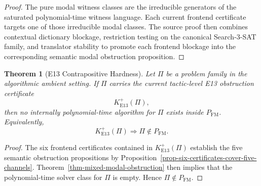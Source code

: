 \documentclass[11pt]{article}
\newtheorem{theorem}{Theorem}[section]
\theoremstyle{definition}
\theoremstyle{remark}
\newcommand{\FM}{\mathrm{FM}}
\begin{document}
\begin{proof}
The pure modal witness classes are the irreducible generators of the saturated polynomial-time witness language. Each current frontend certificate targets one of those irreducible modal classes. The source proof then combines contextual dictionary blockage, restriction testing on the canonical Search-3-SAT family, and translator stability to promote each frontend blockage into the corresponding semantic modal obstruction proposition.
\end{proof}

\begin{theorem}[E13 Contrapositive Hardness]\label{thm-e13-contrapositive-hardness}
Let $\Pi$ be a problem family in the algorithmic ambient setting. If $\Pi$ carries the current tactic-level E13 obstruction certificate
\[
K_{\mathrm{E13}}^+(\Pi),
\]
then no internally polynomial-time algorithm for $\Pi$ exists inside $P_{\FM}$. Equivalently,
\[
K_{\mathrm{E13}}^+(\Pi) \Rightarrow \Pi \notin P_{\FM}.
\]
\end{theorem}

\begin{proof}
The six frontend certificates contained in $K_{\mathrm{E13}}^+(\Pi)$ establish the five semantic obstruction propositions by Proposition~\ref{prop-six-certificates-cover-five-channels}. Theorem~\ref{thm-mixed-modal-obstruction} then implies that the polynomial-time solver class for $\Pi$ is empty. Hence $\Pi \notin P_{\FM}$.
\end{proof}
\end{document}
